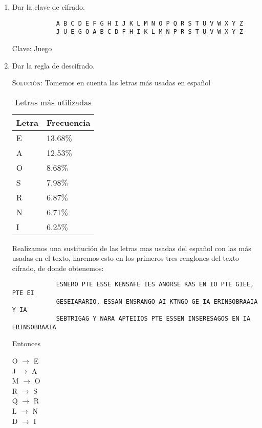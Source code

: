\documentclass[letterpaper,10pt]{article}
\begin{document}
\begin{enumerate}
\begin{enumerate}
        \newpage
        \item Dar la clave de cifrado.
        \begin{verbatim}
            A B C D E F G H I J K L M N O P Q R S T U V W X Y Z
            J U E G O A B C D F H I K L M N P R S T U V W X Y Z
        \end{verbatim}
        
        Clave: Juego

        \item Dar la regla de descifrado.
        
        \textsc{Solución:}
        Tomemos en cuenta las letras más usadas en español
        \begin{table}[h]
        \begin{center}
        \begin{tabular}{|l|l|}
        \hline
        Letra & Frecuencia \\
        \hline 
        E & 13.68$\%$ \\ \hline 
        A & 12.53$\%$ \\ \hline 
        O & 8.68$\%$ \\ \hline 
        S & 7.98$\%$ \\ \hline 
        R & 6.87$\%$ \\ \hline 
        N & 6.71$\%$ \\ \hline 
        I & 6.25$\%$ \\ \hline 
        \end{tabular}
        \caption{Letras más utilizadas}
        \label{tabla:sencilla}
        \end{center}
        \end{table}
        
        Realizamos una sustitución de las letras mas usadas del español con 
        las más usadas en el texto, haremos esto en los primeros tres 
        renglones del texto cifrado, de donde obtenemos:
        
        \begin{verbatim}
            ESNERO PTE ESSE KENSAFE IES ANORSE KAS EN IO PTE GIEE, PTE EI
            GESEIARARIO. ESSAN ENSRANGO AI KTNGO GE IA ERINSOBRAAIA Y IA
            SEBTRIGAG Y NARA APTEIIOS PTE ESSEN INSERESAGOS EN IA ERINSOBRAAIA
        \end{verbatim}
        
        Entonces
        \begin{center}
            O $\rightarrow$ E \\
            J $\rightarrow$ A \\
            M $\rightarrow$ O \\
            R $\rightarrow$ S \\
            Q $\rightarrow$ R \\
            L $\rightarrow$ N \\
            D $\rightarrow$ I
        \end{center}
        

\end{enumerate}
\end{enumerate}
\end{document}
